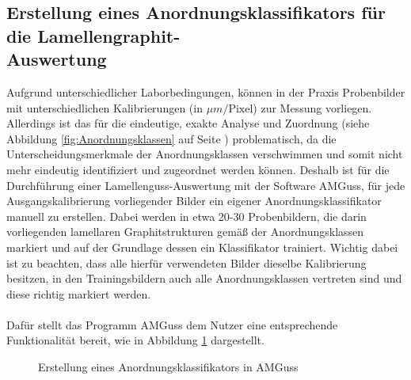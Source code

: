 \documentclass[
fontsize=10pt, 
listof = totoc,
parskip = half	
]{report}
\begin{document}
\subsection{Erstellung eines Anordnungsklassifikators für die Lamellengraphit-\\Auswertung}
\label{subsec: ErstellungAnordnungsklassifAMGuss}

\noindent Aufgrund unterschiedlicher Laborbedingungen, können in der Praxis Probenbilder mit unterschiedlichen Kalibrierungen (in $\mu m/\text{Pixel}$) zur Messung vorliegen. Allerdings ist das für die eindeutige, exakte Analyse und Zuordnung (siehe Abbildung \ref{fig:Anordnungsklassen} auf Seite \pageref{fig:Anordnungsklassen}) problematisch, da die Unterscheidungsmerkmale der Anordnungsklassen verschwimmen und somit nicht mehr eindeutig identifiziert und zugeordnet werden können. Deshalb ist für die Durchführung einer Lamellenguss-Auswertung mit der Software AMGuss, für jede Ausgangskalibrierung vorliegender Bilder ein eigener Anordnungsklassifikator manuell zu erstellen. Dabei werden in etwa 20-30 Probenbildern, die darin vorliegenden lamellaren Graphitstrukturen gemäß der Anordnungsklassen markiert und auf der Grundlage dessen ein Klassifikator trainiert. Wichtig dabei ist zu beachten, dass alle hierfür verwendeten Bilder dieselbe Kalibrierung besitzen, in den Trainingsbildern auch alle Anordnungsklassen vertreten sind und diese richtig markiert werden.
\\\\
Dafür stellt das Programm AMGuss dem Nutzer eine entsprechende Funktionalität bereit, wie in Abbildung \ref{fig:ErstAnordnungsklass} dargestellt.


\begin{figure}[H]
	\centering
	\caption{Erstellung eines Anordnungsklassifikators in AMGuss}
	\label{fig:ErstAnordnungsklass}
\end{figure}
\end{document}
